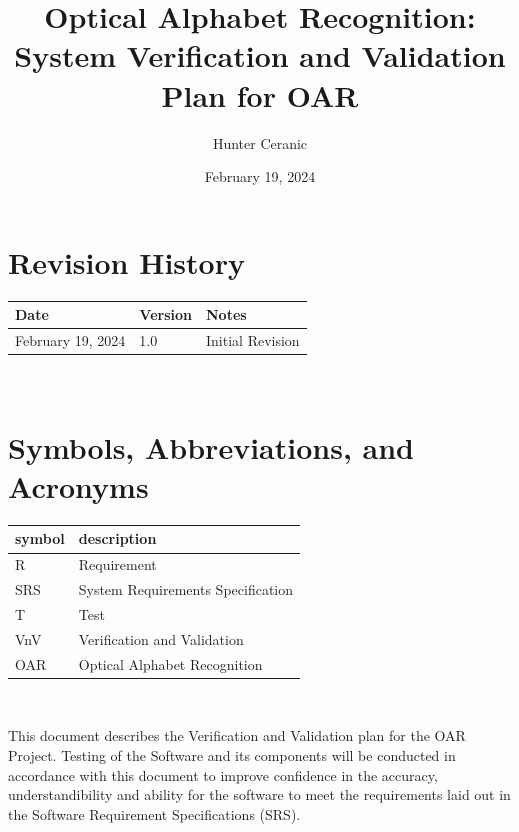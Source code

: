 \documentclass[12pt, titlepage]{article}
\begin{document}
\title{Optical Alphabet Recognition: System Verification and Validation Plan for OAR} 
\author{Hunter Ceranic}
\date{February 19, 2024}
	
\maketitle


\section*{Revision History}

\begin{tabularx}{\textwidth}{p{3cm}p{2cm}X}
\toprule {\bf Date} & {\bf Version} & {\bf Notes}\\
\midrule
February 19, 2024 & 1.0 & Initial Revision\\
\bottomrule
\end{tabularx}

~\\

\newpage

\tableofcontents

\newpage

\section{Symbols, Abbreviations, and Acronyms}

\renewcommand{\arraystretch}{1.2}
\begin{tabular}{l l} 
  \toprule		
  \textbf{symbol} & \textbf{description}\\
  \midrule 
  R & Requirement\\
  SRS & System Requirements Specification\\
  T & Test\\
  VnV & Verification and Validation\\
  OAR & Optical Alphabet Recognition\\
  \bottomrule
\end{tabular}\\

\newpage


This document describes the Verification and Validation plan for the OAR Project. Testing of the Software and its components
will be conducted in accordance with this document to improve confidence in the accuracy, understandibility and ability for the software 
to meet the requirements laid out in the Software Requirement Specifications (SRS).
\end{document}
